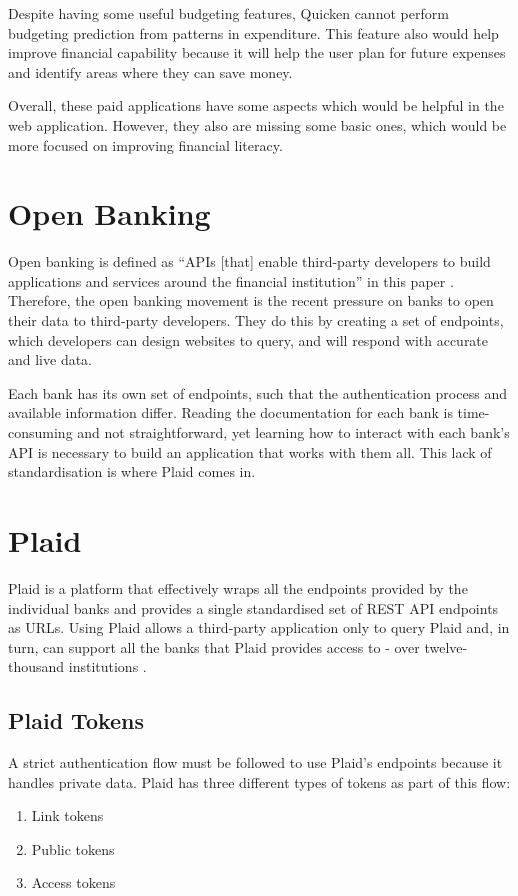Despite having some useful budgeting features, Quicken cannot perform budgeting prediction from patterns in expenditure. This feature also would help improve financial capability because it will help the user plan for future expenses and identify areas where they can save money.

Overall, these paid applications have some aspects which would be helpful in the web application. However, they also are missing some basic ones, which would be more focused on improving financial literacy.
\section{Open Banking}
\label{sec:open-banking}
Open banking is defined as ``APIs [that] enable third-party developers to build applications and services around the financial institution'' in this paper \cite{OpenBankingDefinition}. Therefore, the open banking movement is the recent pressure on banks to open their data to third-party developers. They do this by creating a set of endpoints, which developers can design websites to query, and will respond with accurate and live data.

Each bank has its own set of endpoints, such that the authentication process and available information differ. Reading the documentation for each bank is time-consuming and not straightforward, yet learning how to interact with each bank's API is necessary to build an application that works with them all. This lack of standardisation is where Plaid \cite{Plaid} comes in.
\section{Plaid}
\label{sec:plaid}
Plaid is a platform that effectively wraps all the endpoints provided by the individual banks and provides a single standardised set of REST API endpoints as URLs. Using Plaid allows a third-party application only to query Plaid and, in turn, can support all the banks that Plaid provides access to - over twelve-thousand institutions \cite{PlaidInstitutions}.

\subsection{Plaid Tokens}
A strict authentication flow must be followed to use Plaid's endpoints because it handles private data. Plaid has three different types of tokens as part of this flow:

\begin{enumerate}
    \item Link tokens
    \item Public tokens
    \item Access tokens
\end{enumerate}

